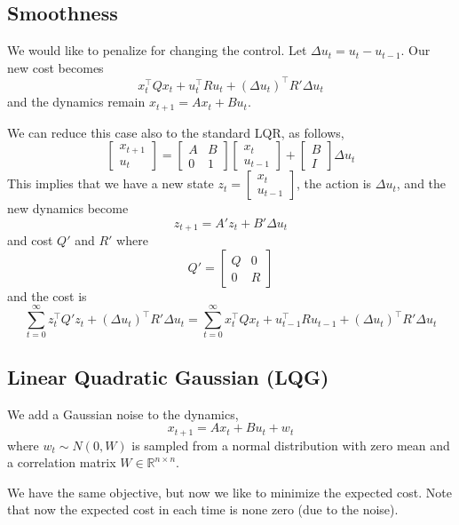 \subsection{Smoothness}

We would like to penalize for changing the control. Let $\Delta
u_t=u_t-u_{t-1}$. Our new cost becomes
\[
x^\top_t Qx_t +u_t^\top R u_t + (\Delta u_t)^\top R' \Delta u_t
\]
and the dynamics remain $x_{t+1}=A x_t + B u_t$.

We can reduce this case also to the standard LQR, as follows,
\[
\begin{bmatrix}
x_{t+1}\\
u_t
\end{bmatrix}
=\begin{bmatrix}
A&B\\
0&1
\end{bmatrix}
\begin{bmatrix}
x_{t}\\
u_{t-1}
\end{bmatrix}+
\begin{bmatrix}
B\\
I
\end{bmatrix}
\Delta u_t
\]
This implies that we have a new state $z_t=\begin{bmatrix}
x_{t}\\
u_{t-1}
\end{bmatrix}$, the action is $\Delta u_t $, and the new dynamics become
\[
z_{t+1}=A'z_t+B'\Delta u_t
\]
and cost $Q'$ and $R'$ where
\[
Q'=\begin{bmatrix}Q & 0\\ 0 & R\end{bmatrix}
\]
and the cost is
\[
\sum_{t=0}^\infty z_t^\top Q'z_t+(\Delta u_t)^\top R' \Delta u_t =
\sum_{t=0}^\infty x_t^\top Qx_t+u_{t-1}^\top R u_{t-1}+(\Delta
u_t)^\top R' \Delta u_t
\]


\subsection{Linear Quadratic Gaussian (LQG)}

We add a Gaussian noise to the dynamics,
\[
x_{t+1}=A x_t + B u_t +w_t
\]
where $w_t \sim N(0,W)$ is sampled from a normal distribution with zero mean and a correlation matrix $W\in \mathbb{R}^{n\times n }$.

We have the same objective, but now we like to minimize the expected
cost. Note that now the expected cost in each time is none zero (due
to the noise).


